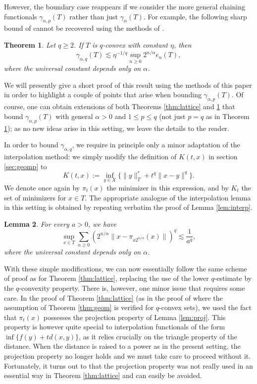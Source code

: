\documentclass[10pt,reqno]{amsart}
\newtheorem{thm}{Theorem}[section]
\newtheorem{lem}[thm]{Lemma}
\theoremstyle{definition}
\numberwithin{equation}{section}
\numberwithin{figure}{section}
\numberwithin{table}{section}
\begin{document}
However, the boundary case reappears if we consider the more general 
chaining functionals $\gamma_{\alpha,p}(T)$ rather than just
$\gamma_\alpha(T)$. For example, the following sharp bound of
\cite[Theorem 4.1.4]{Tal14} cannot be recovered using the methods of 
\cite{vH16a}.

\begin{thm}
\label{thm:ucvx}
Let $q\ge 2$. If $T$ is $q$-convex with constant $\eta$, then
$$
	\gamma_{\alpha,q}(T) \lesssim
	\eta^{-1/q}\sup_{n\ge 0}2^{n/\alpha}e_n(T),
$$
where the universal constant depends only on $\alpha$.
\end{thm}

We will presently give a short proof of this result using the methods of 
this paper in order to highlight a couple of points that arise when 
bounding $\gamma_{\alpha,p}(T)$. Of course, 
one can obtain extensions of both Theorems \ref{thm:lattice} and 
\ref{thm:ucvx} that bound $\gamma_{\alpha,p}(T)$ with general $\alpha>0$ 
and $1\le p\le q$ (not just $p=q$ as in Theorem \ref{thm:ucvx});
as no new ideas arise in this setting, we leave the details to the reader.

In order to bound $\gamma_{\alpha,q}$, we require in principle only a 
minor adaptation of the interpolation method: we simply modify the 
definition of $K(t,x)$ in section \ref{sec:geomp} to
$$
	K(t,x) := \inf_{y\in X}\{\|y\|_T^r + t^q\|x-y\|^q\}.
$$
We denote once again by $\pi_t(x)$ the minimizer in this expression, and 
by $K_t$ the set of minimizers for $x\in T$. The appropriate analogue of 
the interpolation lemma in this setting is obtained by repeating 
verbatim the proof of Lemma \ref{lem:interp}.

\begin{lem}
\label{lem:qinterp}
For every $a>0$, we have
$$
	\sup_{x\in T}\sum_{n\ge 0}
	(2^{n/\alpha}\|x-\pi_{a2^{n/\alpha}}(x)\|)^q
	\lesssim
	\frac{1}{a^q},
$$
where the universal constant depends only on $\alpha$.
\end{lem}

With these simple modifications, we can now essentially follow the same 
scheme of proof as for Theorem \ref{thm:lattice}, replacing the use of the 
lower $q$-estimate by the $q$-convexity property. There is, however, one 
minor issue that requires some care. In the proof of Theorem 
\ref{thm:lattice} (as in the proof of \cite[Lemma 4.7]{vH16a} where the 
assumption of Theorem \ref{thm:geom} is verified for $q$-convex sets), we 
used the fact that $\pi_t(x)$ possesses the projection property of Lemma 
\ref{lem:proj}. This property is however quite special to interpolation 
functionals of the form $\inf\{f(y)+td(x,y)\}$, as it relies crucially on 
the triangle property of the distance. When the distance is raised to a 
power as in the present setting, the projection property no longer holds 
and we must take care to proceed without it. Fortunately, it turns out to 
that the projection property was not really used in an essential way in 
Theorem \ref{thm:lattice} and can easily be avoided.
\end{document}
